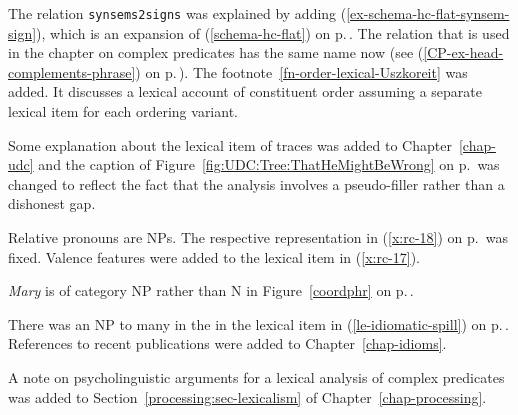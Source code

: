 The relation \texttt{synsems2signs} was explained by adding (\ref{ex-schema-hc-flat-synsem-sign}),
which is an expansion of (\ref{schema-hc-flat}) on p.\,\pageref{schema-hc-flat}. The relation that
is used in the chapter on complex predicates has the same name now (see
(\ref{CP-ex-head-complements-phrase}) on p.\,\pageref{CP-ex-head-complements-phrase}). The
footnote~\ref{fn-order-lexical-Uszkoreit} was added. It discusses a lexical account of constituent
order assuming a separate lexical item for each ordering variant.

Some explanation about the lexical item of traces was added to Chapter~\ref{chap-udc} and the
caption of Figure~\ref{fig:UDC:Tree:ThatHeMightBeWrong} on
p.\, was changed to reflect the fact that the analysis
involves a pseudo-filler rather than a dishonest gap.

Relative pronouns are NPs. The respective representation in (\ref{x:rc-18}) on p.\,\pageref{x:rc-18}
was fixed. Valence features were added to the lexical item in (\ref{x:rc-17}).


\emph{Mary} is of category NP rather than N in Figure~\ref{coordphr} on p.\,\pageref{coordphr}. 

There was an NP to many in the \compsl in the lexical item in (\ref{le-idiomatic-spill}) on
p.\,\pageref{le-idiomatic-spill}. 
References to recent publications were added to Chapter~\ref{chap-idioms}.

A note on psycholinguistic arguments for a lexical analysis of complex predicates was added to
Section~\ref{processing:sec-lexicalism} of Chapter~\ref{chap-processing}. 







